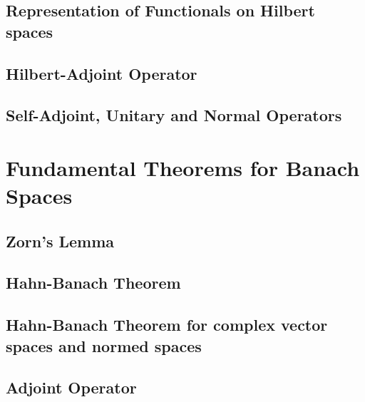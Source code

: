 \subsection{Representation of Functionals on Hilbert spaces}
\subsection{Hilbert-Adjoint Operator}
\subsection{Self-Adjoint, Unitary and Normal Operators}

\section{Fundamental Theorems for Banach Spaces}
\subsection{Zorn's Lemma}
\subsection{Hahn-Banach Theorem}
\subsection{Hahn-Banach Theorem for complex vector spaces and normed spaces}
\setcounter{subsection}{4}
\subsection{Adjoint Operator}
